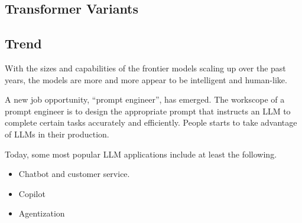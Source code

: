 \subsection{Transformer Variants}

\subsection{Trend}

With the sizes and capabilities of the frontier models scaling up over the past years, the models are more and more appear to be intelligent and human-like. 

A new job opportunity, ``prompt engineer'', has emerged. The workscope of a prompt engineer is to design the appropriate prompt that instructs an LLM to complete certain tasks accurately and efficiently. People starts to take advantage of LLMs in their production. 

Today, some most popular LLM applications include at least the following.
\begin{itemize}
  \item Chatbot and customer service.
  \item Copilot
  \item Agentization
\end{itemize} 